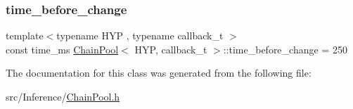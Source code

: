 \mbox{\label{class_chain_pool_a1ff48aa1e09a9a31871dec05d3c0e9d3}} 
\subsubsection{\texorpdfstring{time\+\_\+before\+\_\+change}{time\_before\_change}}
{\footnotesize\ttfamily template$<$typename H\+YP , typename callback\+\_\+t $>$ \\
const time\+\_\+ms \hyperlink{class_chain_pool}{Chain\+Pool}$<$ H\+YP, callback\+\_\+t $>$\+::time\+\_\+before\+\_\+change = 250\hspace{0.3cm}{\ttfamily [static]}}



The documentation for this class was generated from the following file\+:\begin{DoxyCompactItemize}
\item 
src/\+Inference/\hyperlink{_chain_pool_8h}{Chain\+Pool.\+h}\end{DoxyCompactItemize}
